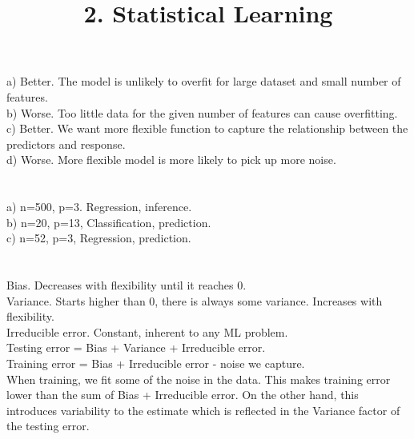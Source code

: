 \documentclass{article}
\begin{document}
\setlength{\parindent}{0pt}
\title{2. Statistical Learning}
\date{}
\maketitle
\section{}

a) Better. The model is unlikely to overfit for large dataset and small number of features. \\
b) Worse. Too little data for the given number of features can cause overfitting. \\
c) Better. We want more flexible function to capture the relationship between the predictors and response. \\
d) Worse. More flexible model is more likely to pick up more noise. \\

\section{}

a) n=500, p=3. Regression, inference. \\
b) n=20, p=13, Classification, prediction. \\
c) n=52, p=3, Regression, prediction. \\

\section{}

Bias. Decreases with flexibility until it reaches 0. \\
Variance. Starts higher than 0, there is always some variance. Increases with flexibility. \\
Irreducible error. Constant, inherent to any ML problem. \\
Testing error = Bias + Variance + Irreducible error. \\
Training error = Bias + Irreducible error - noise we capture. \\

When training, we fit some of the noise in the data. This makes training error lower than the sum
of Bias + Irreducible error. On the other hand, this introduces variability to the estimate which
is reflected in the Variance factor of the testing error.

\section{}
\end{document}

